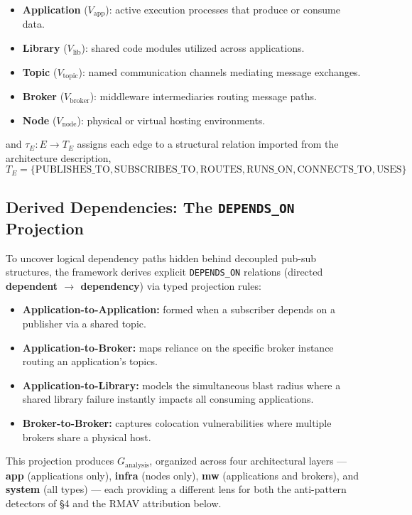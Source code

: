 \documentclass[11pt]{article}
\begin{document}
\begin{itemize}
\item \textbf{Application} ($V_{\text{app}}$): active execution processes that produce or consume
  data.
\item \textbf{Library} ($V_{\text{lib}}$): shared code modules utilized across applications.
\item \textbf{Topic} ($V_{\text{topic}}$): named communication channels mediating message exchanges.
\item \textbf{Broker} ($V_{\text{broker}}$): middleware intermediaries routing message paths.
\item \textbf{Node} ($V_{\text{node}}$): physical or virtual hosting environments.
\end{itemize}

and $\tau_E : E \to T_E$ assigns each edge to a structural relation imported from the architecture
description,
\begin{equation*}
T_E = \{\text{PUBLISHES\_TO}, \text{SUBSCRIBES\_TO}, \text{ROUTES}, \text{RUNS\_ON}, \text{CONNECTS\_TO}, \text{USES}\}
\end{equation*}

\subsection{Derived Dependencies: The \texttt{DEPENDS\_ON} Projection}

To uncover logical dependency paths hidden behind decoupled pub-sub structures, the framework derives
explicit \texttt{DEPENDS\_ON} relations (directed \textbf{dependent $\to$ dependency}) via typed
projection rules:

\begin{itemize}
\item \textbf{Application-to-Application:} formed when a subscriber depends on a publisher via a
  shared topic.
\item \textbf{Application-to-Broker:} maps reliance on the specific broker instance routing an
  application's topics.
\item \textbf{Application-to-Library:} models the simultaneous blast radius where a shared library
  failure instantly impacts all consuming applications.
\item \textbf{Broker-to-Broker:} captures colocation vulnerabilities where multiple brokers share a
  physical host.
\end{itemize}

This projection produces $G_{\text{analysis}}$, organized across four architectural layers ---
\textbf{app} (applications only), \textbf{infra} (nodes only), \textbf{mw} (applications and
brokers), and \textbf{system} (all types) --- each providing a different lens for both the
anti-pattern detectors of \S4 and the RMAV attribution below.
\end{document}
